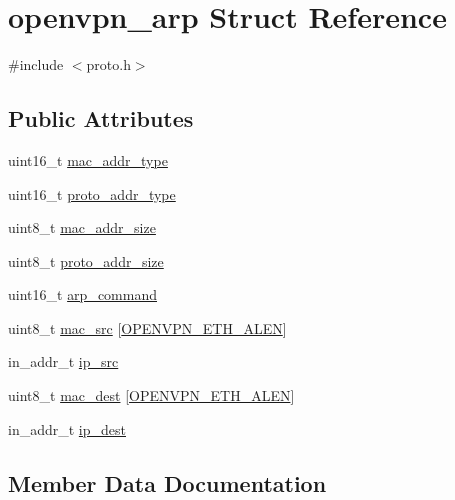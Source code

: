 \hypertarget{structopenvpn__arp}{}\section{openvpn\+\_\+arp Struct Reference}
\label{structopenvpn__arp}


{\ttfamily \#include $<$proto.\+h$>$}

\subsection*{Public Attributes}
\begin{DoxyCompactItemize}
\item 
uint16\+\_\+t \hyperlink{structopenvpn__arp_a933e50b8d37739eec0f1baf778b5833e}{mac\+\_\+addr\+\_\+type}
\item 
uint16\+\_\+t \hyperlink{structopenvpn__arp_a8781e8a314c8a5fb35a1415fa57afed9}{proto\+\_\+addr\+\_\+type}
\item 
uint8\+\_\+t \hyperlink{structopenvpn__arp_a407c6df3489a3fd988e5523c3f18a6b2}{mac\+\_\+addr\+\_\+size}
\item 
uint8\+\_\+t \hyperlink{structopenvpn__arp_a870c9834a3c747ed8c5e584f5905bd7e}{proto\+\_\+addr\+\_\+size}
\item 
uint16\+\_\+t \hyperlink{structopenvpn__arp_ae386a995696a561d2fd0cbd5c1419347}{arp\+\_\+command}
\item 
uint8\+\_\+t \hyperlink{structopenvpn__arp_a05d07f54de71b37856289afd58b365bb}{mac\+\_\+src} \mbox{[}\hyperlink{proto_8h_a6324dad6dba94d99632f089372acde4a}{O\+P\+E\+N\+V\+P\+N\+\_\+\+E\+T\+H\+\_\+\+A\+L\+E\+N}\mbox{]}
\item 
in\+\_\+addr\+\_\+t \hyperlink{structopenvpn__arp_a0dcf6db5eee161a868f01e6e64fbade1}{ip\+\_\+src}
\item 
uint8\+\_\+t \hyperlink{structopenvpn__arp_a14db5afc7441d184a86814d7fb3ae02d}{mac\+\_\+dest} \mbox{[}\hyperlink{proto_8h_a6324dad6dba94d99632f089372acde4a}{O\+P\+E\+N\+V\+P\+N\+\_\+\+E\+T\+H\+\_\+\+A\+L\+E\+N}\mbox{]}
\item 
in\+\_\+addr\+\_\+t \hyperlink{structopenvpn__arp_a729969d236bbd9d97dd91845e1212ff8}{ip\+\_\+dest}
\end{DoxyCompactItemize}


\subsection{Member Data Documentation}
\hypertarget{structopenvpn__arp_ae386a995696a561d2fd0cbd5c1419347}{}
